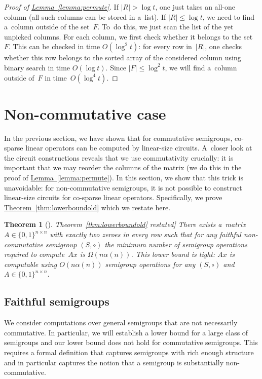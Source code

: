 \documentclass[11pt]{article}
\numberwithin{equation}{section}
\newtheorem{theorem}{Theorem}[section]
\theoremstyle{definition}
\theoremstyle{plain}
\newcommand{\expref}[2]{\hyperref[#2]{#1~\ref{#2}}}
\theoremstyle{plain}\newtheorem{observation}[theorem]{Observation}
\begin{document}
\begin{proof}[Proof of {\expref{Lemma}{lemma:permute}}]
    If $|R| > \log t$, one just takes an all-one column (all such columns
    can be stored in a~list). If $|R| \le \log t$, we need to find a~column outside
    of the set~$F$. To~do this, we just scan the list of the yet unpicked columns. For
    each column, we first check whether it belongs to the set~$F$. This can be
    checked in time $O(\log^2t)$: for every row in~$|R|$, one checks whether this
    row belongs to the sorted array of the considered column using binary search in
    time $O(\log t)$. Since $|F| \le \log^2t$, we will find a~column outside of~$F$
    in time~$O(\log^4 t)$.

\end{proof}


\section{Non-commutative case}
\label{sec-non-commutative}

In the previous section, we have shown that for commutative semigroups,
%
%
%
co-sparse
linear operators can be computed by linear-size circuits. A~closer look at the
circuit constructions reveals that we use commutativity crucially: it is
important that we may reorder the columns of the matrix (we do this in the proof
of \expref{Lemma}{lemma:permute}). In this section, we show that this trick is
unavoidable: for non-commutative semigroups, it is not possible to construct
linear-size circuits for
%
%
co-sparse
linear operators. %
Specifically,  %
we prove \expref{Theorem}{thm:lowerboundold}
which we restate here.  %


%
\begin{theorem}[\expref{Theorem}{thm:lowerboundold} restated]
    \label{thm:lowerbound}
    There exists
    a~matrix~$A \in \{0,1\}^{n \times n}$ with exactly two zeroes
    in every row such that for any faithful non-commutative semigroup $(S, \circ)$
    the minimum number of semigroup operations required to compute~$Ax$ is
    $\Omega(n\alpha(n))$.
    This lower bound is tight: $Ax$ is computable using $O(n\alpha(n))$ semigroup
    operations for any $(S, \circ)$ and $A\in \{0,1\}^{n \times n}$.
\end{theorem}

\subsection{Faithful semigroups}

We consider computations over general semigroups that are not necessarily
commutative. In particular, we will establish a lower bound for a large class of
semigroups and our lower bound does not hold for commutative semigroups. This
requires a formal definition that captures semigroups with rich enough structure
and in particular %
%
captures the notion   %
that a semigroup is substantially non-commutative.
\end{document}
